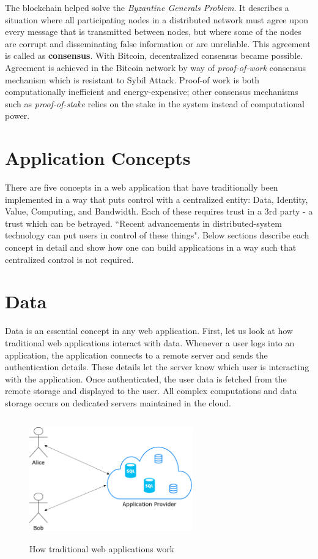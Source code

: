 	The blockchain helped solve the \textit{Byzantine Generals Problem}\cite{lamport1982byzantine}. It describes a situation where all participating nodes in a distributed network must agree upon every message that is transmitted between nodes, but where some of the nodes are corrupt and disseminating false information or are unreliable. This agreement is called as \textbf{consensus}. With Bitcoin\cite{nakamoto2008bitcoin}, decentralized consensus became possible. Agreement is achieved in the Bitcoin network by way of \textit{proof-of-work}\cite{wiki:pow} consensus mechanism which is resistant to Sybil Attack\cite{douceur2002sybil}. Proof-of work is both computationally inefficient and energy-expensive; other consensus mechanisms such as \textit{proof-of-stake}\cite{wiki:pos} relies on the stake in the system instead of computational power.
	
\section{Application Concepts}
	There are five concepts in a web application that have traditionally been implemented in a way that puts control with a centralized entity: Data, Identity, Value, Computing, and Bandwidth\cite{raval2016decentralized}. Each of these requires trust in a 3rd party - a trust which can be betrayed. ``Recent advancements in distributed-system technology can put users in control of these things"\cite{raval2016decentralized}. Below sections describe each concept in detail and show how one can build applications in a way such that centralized control is not required.

\section{Data}
	Data is an essential concept in any web application. First, let us look at how traditional web applications interact with data. Whenever a user logs into an application, the application connects to a remote server and sends the authentication details. These details let the server know which user is interacting with the application. Once authenticated, the user data is fetched from the remote storage and displayed to the user. All complex computations and data storage occurs on dedicated servers maintained in the cloud.
	
	\begin{figure}[h]
		\centering
		\includegraphics[width=200pt, height=150pt]{figures/traditional-app}
		\caption{\label{fig:traditional-app} How traditional web applications work}
	\end{figure}
	
